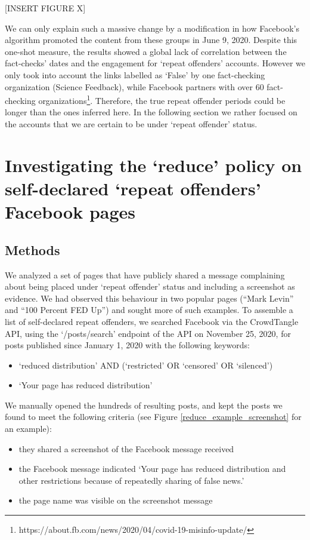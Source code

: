 \documentclass[11pt,a4paper]{article}
\begin{document}
[INSERT FIGURE X]

We can only explain such a massive change by a modification in how Facebook’s algorithm promoted the content from these groups in June 9, 2020.
Despite this one-shot measure, the results showed a global lack of correlation between the fact-checks' dates and the engagement for `repeat offenders' accounts.
However we only took into account the links labelled as `False' by one fact-checking organization (Science Feedback), while Facebook partners with over 60 fact-checking organizations\footnote{https://about.fb.com/news/2020/04/covid-19-misinfo-update/}.
Therefore, the true repeat offender periods could be longer than the ones inferred here.
In the following section we rather focused on the accounts that we are certain to be under `repeat offender' status. 

\section{Investigating the `reduce’ policy on self-declared ‘repeat offenders’ Facebook pages}

\subsection{Methods}

We analyzed a set of pages that have publicly shared a message complaining about being placed under ‘repeat offender’ status and including a screenshot as evidence. 
We had observed this behaviour in two popular pages (“Mark Levin” and “100 Percent FED Up”) and sought more of such examples. 
To assemble a list of self-declared repeat offenders, we searched Facebook via the CrowdTangle API, using the `/posts/search' endpoint of the API on November 25, 2020, for posts published since January 1, 2020 with the following keywords:
\begin{itemize}
\item `reduced distribution' AND (`restricted' OR `censored' OR `silenced')
\item `Your page has reduced distribution'
\end{itemize}

We manually opened the hundreds of resulting posts, and kept the posts we found to meet the following criteria (see Figure \ref{reduce_example_screenshot} for an example):
\begin{itemize}
\item they shared a screenshot of the Facebook message received
\item the Facebook message indicated `Your page has reduced distribution and other restrictions because of repeatedly sharing of false news.'
\item the page name was visible on the screenshot message
\end{itemize}
\end{document}
